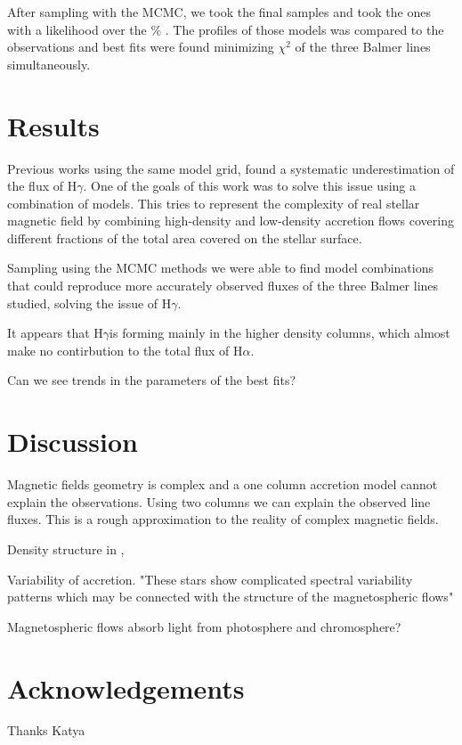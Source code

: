 \documentclass[twocolumn,linenumbers]{aastex631}
\newcommand{\halpha}{H$\alpha$}
\newcommand{\hgamma}{H$\gamma$}
\begin{document}
After sampling with the MCMC, we took the final samples and took the ones with a likelihood over the \% . The profiles of those models was compared to the observations and best fits were found minimizing $\chi^2$ of the three Balmer lines simultaneously.

\section{Results}

Previous works using the same model grid, found a systematic underestimation of the flux of \hgamma. One of the goals of this work was to solve this issue using a combination of models. This tries to represent the complexity of real stellar magnetic field by combining high-density and low-density accretion flows covering different fractions of the total area covered on the stellar surface.

Sampling using the MCMC methods we were able to find model combinations that could reproduce more accurately observed fluxes of the three Balmer lines studied, solving the issue of \hgamma.

It appears that \hgamma is forming mainly in the higher density columns, which almost make no contirbution to the total flux of \halpha. 

Can we see trends in the parameters of the best fits?

\section{Discussion} \label{Discussion}

Magnetic fields geometry is complex and a one column accretion model cannot explain the observations. Using two columns we can explain the observed line fluxes. This is a rough approximation to the reality of complex magnetic fields.

Density structure in \citet{zhaohuan2024}, \citet{espaillat2021}

Variability of accretion. "These stars show complicated spectral variability patterns which may be connected with the structure of the magnetospheric flows" \citep{romanova2003}

Magnetospheric flows absorb light from photosphere and chromosphere? \citep{atom2023}

\section*{Acknowledgements}

Thanks Katya


{}

\end{document}

